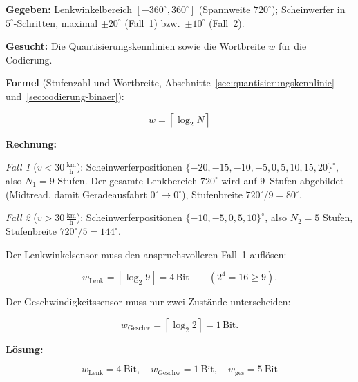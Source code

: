 \begin{beispiel}

\textbf{Gegeben:} Lenkwinkelbereich $[-360^\circ, 360^\circ]$ (Spannweite
$720^\circ$); Scheinwerfer in $5^\circ$-Schritten, maximal $\pm 20^\circ$
(Fall~1) bzw.\ $\pm 10^\circ$ (Fall~2).

\textbf{Gesucht:} Die Quantisierungskennlinien sowie die Wortbreite $w$ für die
Codierung.

\textbf{Formel} (Stufenzahl und Wortbreite,
Abschnitte~\ref{sec:quantisierungskennlinie} und~\ref{sec:codierung-binaer}):

$$
w = \left\lceil \log_2 N \right\rceil
$$

\textbf{Rechnung:}

\emph{Fall 1} ($v < 30\,\tfrac{\text{km}}{\text{h}}$): Scheinwerferpositionen
$\{-20, -15, -10, -5, 0, 5, 10, 15, 20\}^\circ$, also $N_1 = 9$ Stufen. Der
gesamte Lenkbereich $720^\circ$ wird auf $9$~Stufen abgebildet (Midtread, damit
Geradeausfahrt $0^\circ \to 0^\circ$), Stufenbreite $720^\circ/9 = 80^\circ$.

\emph{Fall 2} ($v > 30\,\tfrac{\text{km}}{\text{h}}$): Scheinwerferpositionen
$\{-10, -5, 0, 5, 10\}^\circ$, also $N_2 = 5$ Stufen, Stufenbreite
$720^\circ/5 = 144^\circ$.

Der Lenkwinkelsensor muss den anspruchsvolleren Fall~1 auflösen:

$$
w_{\text{Lenk}} = \left\lceil \log_2 9 \right\rceil = 4\,\text{Bit}
\qquad (2^4 = 16 \geq 9).
$$

Der Geschwindigkeitssensor muss nur zwei Zustände unterscheiden:

$$
w_{\text{Geschw}} = \left\lceil \log_2 2 \right\rceil = 1\,\text{Bit}.
$$

\textbf{Lösung:}

$$
\boxed{\;w_{\text{Lenk}} = 4\ \text{Bit}, \quad w_{\text{Geschw}} = 1\ \text{Bit},
\quad w_{\text{ges}} = 5\ \text{Bit}\;}
$$


\end{beispiel}

